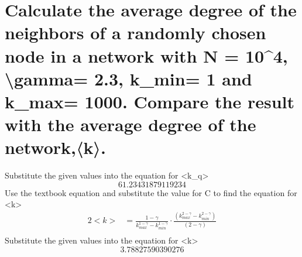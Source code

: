 \documentclass{article}%
\begin{document}
%
\section{Calculate the average degree of the neighbors of a randomly chosen node in a network with N = 10\^{}4, \textbackslash{}gamma= 2.3, k\_min= 1 and k\_max= 1000. Compare the result with the average degree of the network,〈k〉.}%
\label{sec:CalculatetheaveragedegreeoftheneighborsofarandomlychosennodeinanetworkwithN=104,gamma=2.3,kmin=1andkmax=1000.Comparetheresultwiththeaveragedegreeofthenetwork,k.}%
Substitute the given values into the equation for <k\_q>%
\[%
61.23431879119234%
\]%
Use the textbook equation and substitute the value for C to find the equation for <k>%
\begin{alignat*}{2}%
<k>&=\frac{1-\gamma}{k_{max}^{1-\gamma}-k_{min}^{1-\gamma}}\cdot\frac{(k_{max}^{2-\gamma}-k_{min}^{2-\gamma})}{(2-\gamma)}\\%
\end{alignat*}%
Substitute the given values into the equation for <k>%
\[%
3.78827590390276%
\]

%
\end{document}
